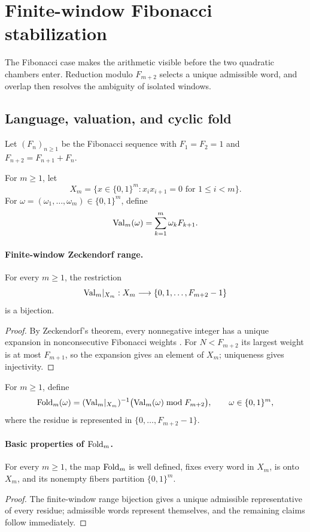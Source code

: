\section{Finite-window Fibonacci stabilization}\label{sec:stabilization}

The Fibonacci case makes the arithmetic visible before the two quadratic
chambers enter.  Reduction modulo $F_{m+2}$ selects a unique admissible word,
and overlap then resolves the ambiguity of isolated windows.

\subsection{Language, valuation, and cyclic fold}\label{sec:stab:golden}

Let $(F_n)_{n\ge1}$ be the Fibonacci sequence with $F_1=F_2=1$ and
$F_{n+2}=F_{n+1}+F_n$.

\begin{definition}\label{def:Xm}
For $m\ge1$, let
\[
X_m=\{x\in\{0,1\}^m:x_ix_{i+1}=0\text{ for }1\le i<m\}.
\]
For $\omega=(\omega_1,\ldots,\omega_m)\in\{0,1\}^m$, define
\[
\mathrm{Val}_m(\omega)=\sum_{k=1}^m\omega_kF_{k+1}.
\]
\end{definition}

\paragraph{Finite-window Zeckendorf range.}\label{prop:finite-window-range}
For every $m\ge1$, the restriction
\[
\mathrm{Val}_m|_{X_m}:X_m\longrightarrow\{0,1,\ldots,F_{m+2}-1\}
\]
is a bijection.

\begin{proof}
By Zeckendorf's theorem, every nonnegative integer has a unique expansion in
nonconsecutive Fibonacci weights \cite{Zeckendorf1972,Lothaire2002}.  For
$N<F_{m+2}$ its largest weight is at most $F_{m+1}$, so the expansion gives
an element of $X_m$; uniqueness gives injectivity.
\end{proof}

\begin{definition}\label{def:fold}
For $m\ge1$, define
\[
\mathrm{Fold}_m(\omega)=
(\mathrm{Val}_m|_{X_m})^{-1}\bigl(\mathrm{Val}_m(\omega)\bmod F_{m+2}\bigr),
\qquad \omega\in\{0,1\}^m,
\]
where the residue is represented in $\{0,\ldots,F_{m+2}-1\}$.
\end{definition}

\paragraph{Basic properties of $\mathrm{Fold}_m$.}\label{thm:fold-suite}
For every $m\ge1$, the map $\mathrm{Fold}_m$ is well defined, fixes every word in
$X_m$, is onto $X_m$, and its nonempty fibers partition $\{0,1\}^m$.

\begin{proof}
The finite-window range bijection gives a unique admissible representative
of every residue; admissible words represent themselves, and the remaining
claims follow immediately.
\end{proof}
